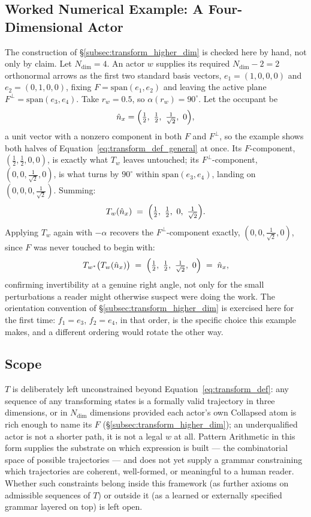 \documentclass[12pt, a4paper]{article}
\begin{document}
\subsection{Worked Numerical Example: A Four-Dimensional Actor}
\label{subsec:transform_example_4d}
The construction of \S\ref{subsec:transform_higher_dim} is checked
here by hand, not only by claim. Let $N_{\mathrm{dim}}=4$. An actor
$w$ supplies its required $N_{\mathrm{dim}}-2=2$ orthonormal arrows as
the first two standard basis vectors, $e_1=(1,0,0,0)$ and
$e_2=(0,1,0,0)$, fixing $F=\mathrm{span}(e_1,e_2)$ and leaving the
active plane $F^\perp=\mathrm{span}(e_3,e_4)$. Take $r_w=0.5$, so
$\alpha(r_w)=90^\circ$. Let the occupant be
\[
\hat n_x = \Bigl(\tfrac12,\ \tfrac12,\ \tfrac{1}{\sqrt2},\ 0\Bigr),
\]
a unit vector with a nonzero component in both $F$ and $F^\perp$, so
the example shows both halves of Equation~\eqref{eq:transform_def_general}
at once. Its $F$-component, $(\tfrac12,\tfrac12,0,0)$, is exactly
what $T_w$ leaves untouched; its $F^\perp$-component,
$(0,0,\tfrac{1}{\sqrt2},0)$, is what turns by $90^\circ$ within
$\mathrm{span}(e_3,e_4)$, landing on $(0,0,0,\tfrac{1}{\sqrt2})$.
Summing:
\begin{equation}
    T_w(\hat n_x) \;=\; \Bigl(\tfrac12,\ \tfrac12,\ 0,\ \tfrac{1}{\sqrt2}\Bigr).
\end{equation}
Applying $T_w$ again with $-\alpha$ recovers the $F^\perp$-component
exactly, $(0,0,\tfrac{1}{\sqrt2},0)$, since $F$ was never touched to
begin with:
\begin{equation}
    T_{w^*}\bigl(T_w(\hat n_x)\bigr) \;=\; \Bigl(\tfrac12,\ \tfrac12,\ \tfrac{1}{\sqrt2},\ 0\Bigr) \;=\; \hat n_x,
\end{equation}
confirming invertibility at a genuine right angle, not only for the
small perturbations a reader might otherwise suspect were doing the
work. The orientation convention of
\S\ref{subsec:transform_higher_dim} is exercised here for the first
time: $f_1=e_3$, $f_2=e_4$, in that order, is the specific choice
this example makes, and a different ordering would rotate the other
way.

\subsection{Scope}
\label{subsec:transform_scope}
$T$ is deliberately left unconstrained beyond
Equation~\eqref{eq:transform_def}: any sequence of any transforming
states is a formally valid trajectory in three dimensions, or in
$N_{\mathrm{dim}}$ dimensions provided each actor's own Collapsed atom is
rich enough to name its $F$ (\S\ref{subsec:transform_higher_dim}); an
underqualified actor is not a shorter path, it is not a legal $w$ at
all. Pattern Arithmetic in this form
supplies the substrate on which expression is built --- the
combinatorial space of possible trajectories --- and does not yet
supply a grammar constraining which trajectories are coherent,
well-formed, or meaningful to a human reader. Whether such constraints
belong inside this framework (as further axioms on admissible
sequences of $T$) or outside it (as a learned or externally specified
grammar layered on top) is left open.
\end{document}
